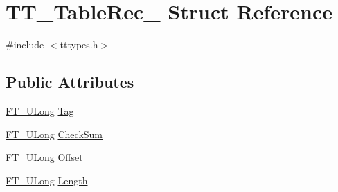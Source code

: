 \hypertarget{struct_t_t___table_rec__}{\section{T\-T\-\_\-\-Table\-Rec\-\_\- Struct Reference}
\label{struct_t_t___table_rec__}
}


{\ttfamily \#include $<$tttypes.\-h$>$}

\subsection*{Public Attributes}
\begin{DoxyCompactItemize}
\item 
\hyperlink{fttypes_8h_a4fac88bdba78eb76b505efa6e4fbf3f5}{F\-T\-\_\-\-U\-Long} \hyperlink{struct_t_t___table_rec___aaccaf9e9d3421fc37fa6e51875534995}{Tag}
\item 
\hyperlink{fttypes_8h_a4fac88bdba78eb76b505efa6e4fbf3f5}{F\-T\-\_\-\-U\-Long} \hyperlink{struct_t_t___table_rec___aacf9207fae3522bb65359c2288900fca}{Check\-Sum}
\item 
\hyperlink{fttypes_8h_a4fac88bdba78eb76b505efa6e4fbf3f5}{F\-T\-\_\-\-U\-Long} \hyperlink{struct_t_t___table_rec___a91840e1cee040f8da6a34a081dda17b6}{Offset}
\item 
\hyperlink{fttypes_8h_a4fac88bdba78eb76b505efa6e4fbf3f5}{F\-T\-\_\-\-U\-Long} \hyperlink{struct_t_t___table_rec___aa0d3a1f4491bf4418bc26241bdd7d21b}{Length}
\end{DoxyCompactItemize}



